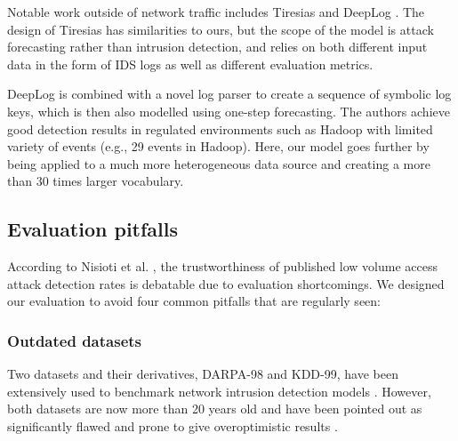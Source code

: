 Notable work outside of network traffic includes Tiresias \cite{shen2018tiresias}%
and DeepLog \cite{du2017deeplog}. %
The design of Tiresias has similarities to ours, but the scope of the model is attack forecasting rather than intrusion detection, and relies on both different input data in the form of IDS logs as well as different evaluation metrics.

DeepLog is combined with a novel log parser to create a sequence of symbolic log keys, which is then also modelled using one-step forecasting. The authors achieve good detection results in regulated environments such as Hadoop with limited variety of events (e.g., 29 events in Hadoop). Here, our model goes further by being applied to a much more heterogeneous data source and creating a more than 30 times larger vocabulary.

\subsection{Evaluation pitfalls}\label{Sec:Evalmal}

According to Nisioti et al. \cite{nisioti2018intrusion}, the trustworthiness of published low volume access attack detection rates is debatable due to evaluation shortcomings.
We designed our evaluation to avoid four common pitfalls that are regularly seen:

\subsubsection{Outdated datasets}

Two datasets and their derivatives, DARPA-98 %
and KDD-99, have been extensively used to benchmark network intrusion detection models \cite{ozgur2016review}. %
However, both datasets are now more than 20 years old and have been pointed out as significantly flawed and prone to give overoptimistic results %
\cite{tavallaee2009detailed}. %


